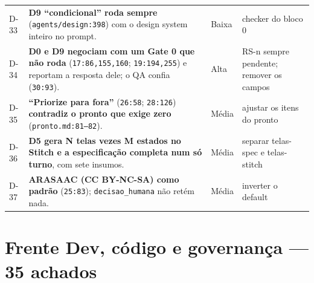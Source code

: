 \documentclass[11pt,a4paper]{article}
\begin{document}
\begin{longtable}{@{}p{0.9cm} >{\raggedright\arraybackslash}p{8.6cm} p{1.1cm} >{\raggedright\arraybackslash}p{4.9cm}@{}}
D-33 & \textbf{D9 ``condicional'' roda sempre} (\texttt{agents/design:398}) com o design system inteiro no prompt. & Baixa & checker do bloco 0 \\
D-34 & \textbf{D0 e D9 negociam com um Gate 0 que não roda} (\texttt{17:86,155,160}; \texttt{19:194,255}) e reportam a resposta dele; o QA confia (\texttt{30:93}). & Alta & RS-n sempre pendente; remover os campos \\
D-35 & \textbf{``Priorize para fora''} (\texttt{26:58}; \texttt{28:126}) \textbf{contradiz o pronto que exige zero} (\texttt{pronto.md:81--82}). & Média & ajustar os itens do pronto \\
D-36 & \textbf{D5 gera N telas vezes M estados no Stitch e a especificação completa num só turno}, com sete insumos. & Média & separar telas-spec e telas-stitch \\
D-37 & \textbf{ARASAAC (CC BY-NC-SA) como padrão} (\texttt{25:83}); \texttt{decisao\_humana} não retém nada. & Média & inverter o default \\
\end{longtable}
\normalsize

\section{Frente Dev, código e governança --- 35 achados}
\end{document}
